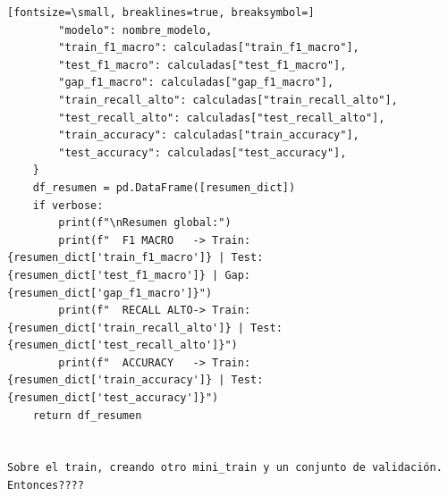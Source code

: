 \documentclass[12pt,a4paper,oneside]{book}
\begin{document}
\begin{iaprompt}
\begin{Verbatim}[fontsize=\small, breaklines=true, breaksymbol=]
        "modelo": nombre_modelo,
        "train_f1_macro": calculadas["train_f1_macro"],
        "test_f1_macro": calculadas["test_f1_macro"],
        "gap_f1_macro": calculadas["gap_f1_macro"],
        "train_recall_alto": calculadas["train_recall_alto"],
        "test_recall_alto": calculadas["test_recall_alto"],
        "train_accuracy": calculadas["train_accuracy"],
        "test_accuracy": calculadas["test_accuracy"],
    }
    df_resumen = pd.DataFrame([resumen_dict])
    if verbose:
        print(f"\nResumen global:")
        print(f"  F1 MACRO   -> Train: {resumen_dict['train_f1_macro']} | Test: {resumen_dict['test_f1_macro']} | Gap: {resumen_dict['gap_f1_macro']}")
        print(f"  RECALL ALTO-> Train: {resumen_dict['train_recall_alto']} | Test: {resumen_dict['test_recall_alto']}")
        print(f"  ACCURACY   -> Train: {resumen_dict['train_accuracy']} | Test: {resumen_dict['test_accuracy']}")
    return df_resumen


Sobre el train, creando otro mini_train y un conjunto de validación. Entonces????
\end{Verbatim}
\end{iaprompt}
\end{document}
